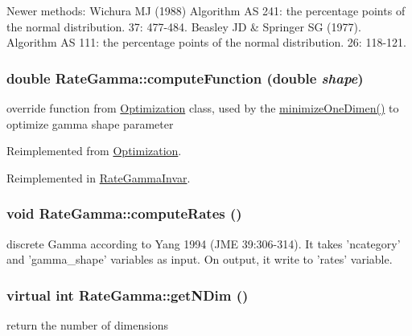 Newer methods: Wichura MJ (1988) Algorithm AS 241: the percentage points of the normal distribution. 37: 477-\/484. Beasley JD \& Springer SG (1977). Algorithm AS 111: the percentage points of the normal distribution. 26: 118-\/121. \hypertarget{classRateGamma_a24e01b7ec0d9170ceebcf03b603b2bbb}{
\subsubsection[{computeFunction}]{\setlength{\rightskip}{0pt plus 5cm}double RateGamma::computeFunction (double {\em shape})}}
\label{classRateGamma_a24e01b7ec0d9170ceebcf03b603b2bbb}
override function from \hyperlink{classOptimization}{Optimization} class, used by the \hyperlink{classOptimization_a59ccdfae81744716ce48226da029d470}{minimizeOneDimen()} to optimize gamma shape parameter 

Reimplemented from \hyperlink{classOptimization_ad7ca7b884076f8c76312d516e23c6609}{Optimization}.

Reimplemented in \hyperlink{classRateGammaInvar_a48fde92a023867c5d0656572f8dc0f71}{RateGammaInvar}.\hypertarget{classRateGamma_a487fec4116b061846ec8cf1dd5d5b43f}{
\subsubsection[{computeRates}]{\setlength{\rightskip}{0pt plus 5cm}void RateGamma::computeRates ()}}
\label{classRateGamma_a487fec4116b061846ec8cf1dd5d5b43f}
discrete Gamma according to Yang 1994 (JME 39:306-\/314). It takes 'ncategory' and 'gamma\_\-shape' variables as input. On output, it write to 'rates' variable. \hypertarget{classRateGamma_af271c0115c8a81ff6fac32d1cfef6187}{
\subsubsection[{getNDim}]{\setlength{\rightskip}{0pt plus 5cm}virtual int RateGamma::getNDim ()}}
\label{classRateGamma_af271c0115c8a81ff6fac32d1cfef6187}
return the number of dimensions 

